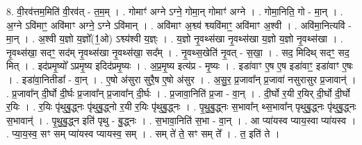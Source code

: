 \documentclass[17pt]{extarticle}
\begin{document}
8. वी॒रव॑त्तम॒मिति॑ वी॒रव॑त् - त॒म॒म् । . गोमाꣳ॑ अग्ने ऽग्ने॒ गोमा॒न् गोमाꣳ॑ अग्ने । . गोमा॒निति॒ गो - मा॒न् । . अ॒ग्ने ऽवि॑माꣳ॒॒ अवि॑माꣳ अग्ने॒ ऽग्ने ऽवि॑मान् । . अवि॑माꣳ अ॒श्व्य॑ श्व्यवि॑माꣳ॒॒ अवि॑माꣳ अ॒श्वी । . अवि॑मा॒नित्यवि॑ - मा॒न् । . अ॒श्वी य॒ज्ञो य॒ज्ञो᳚(1॒ओ) ऽश्व्य॑श्वी य॒ज्ञ्ः । . य॒ज्ञो नृ॒वथ्स॑खा नृ॒वथ्स॑खा य॒ज्ञो य॒ज्ञो नृ॒वथ्स॑खा । . नृ॒वथ्स॑खा॒ सदꣳ॒॒ सद॑म् नृ॒वथ्स॑खा नृ॒वथ्स॑खा॒ सद᳚म् । . नृ॒वथ्स॒खेति॑ नृ॒वत् - स॒खा॒ । . सद॒ मिदिथ् सदꣳ॒॒ सद॒ मित् । . इद॑प्रमृ॒ष्यो᳚ ऽप्रमृ॒ष्य इदिद॑प्रमृ॒ष्यः । . अ॒प्र॒मृ॒ष्य इत्य॑प्र - मृ॒ष्यः । . इडा॑वाꣳ ए॒ष ए॒ष इडा॑वाꣳ॒॒ इडा॑वाꣳ ए॒षः । . इडा॑वा॒नितीडा᳚ - वा॒न् । . ए॒षो अ॑सुरा सुरै॒ष ए॒षो अ॑सुर । . अ॒सु॒र॒ प्र॒जावा᳚न् प्र॒जावा॑ नसुरासुर प्र॒जावान्॑ । . प्र॒जावा᳚न् दी॒र्घो दी॒र्घः प्र॒जावा᳚न् प्र॒जावा᳚न् दी॒र्घः । . प्र॒जावा॒निति॑ प्र॒जा - वा॒न् । . दी॒र्घो र॒यी र॒यिर् दी॒र्घो दी॒र्घो र॒यिः । . र॒यिः पृ॑थुबु॒द्ध्नः पृ॑थुबु॒द्ध्नो र॒यी र॒यिः पृ॑थुबु॒द्ध्नः । . पृ॒थु॒बु॒द्ध्नः स॒भावा᳚न् थ्स॒भावा᳚न् पृथुबु॒द्ध्नः पृ॑थुबु॒द्ध्नः स॒भावान्॑ । . पृ॒थु॒बु॒द्ध्न इति॑ पृथु - बु॒द्ध्नः । . स॒भावा॒निति॑ स॒भा - वा॒न् । . आ प्या॑यस्व प्याय॒स्वा प्या॑यस्व । . प्या॒य॒स्व॒ सꣳ सम् प्या॑यस्व प्यायस्व॒ सम् । . सम् ते॑ ते॒ सꣳ सम् ते᳚ । . त॒ इति॑ ते । \newline
\end{document}
